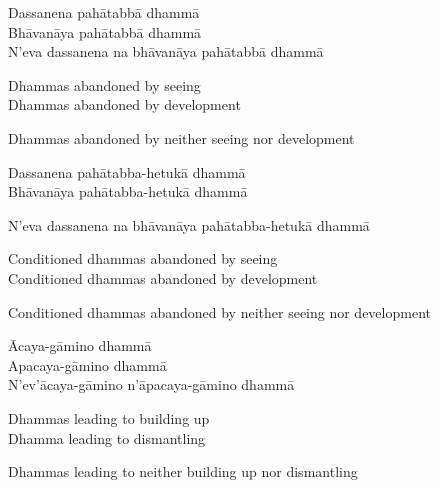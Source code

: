 \begin{pali-hang-continued}
  Dassanena pahātabbā dhammā\\
  Bhāvanāya pahātabbā dhammā\\
  N'eva dassanena na bhāvanāya pahātabbā dhammā
\end{pali-hang-continued}

\ifafive\clearpage\fi

\begin{english-verses}
  Dhammas abandoned by seeing\\
  Dhammas abandoned by development\\
  \begin{english-hang-together-verses}
  Dhammas abandoned by neither seeing nor development
  \end{english-hang-together-verses}
\end{english-verses}

\begin{pali-hang-continued}
  Dassanena pahātabba-hetukā dhammā\\
  Bhāvanāya pahātabba-hetukā dhammā\\
  \begin{pali-hang-together}
  N'eva dassanena na bhāvanāya pahātabba-hetukā dhammā
  \end{pali-hang-together}
\end{pali-hang-continued}

\begin{english-verses}
  Conditioned dhammas abandoned by seeing\\
  Conditioned dhammas abandoned by development\\
  \begin{english-hang-together-verses}
  Conditioned dhammas abandoned by neither seeing nor development
  \end{english-hang-together-verses}
\end{english-verses}

\ifninebythirteen\clearpage\fi

\begin{pali-hang-continued}
  Ācaya-gāmino dhammā\\
  Apacaya-gāmino dhammā\\
  N'ev'ācaya-gāmino n'āpacaya-gāmino dhammā
\end{pali-hang-continued}

\begin{english-verses}
  Dhammas leading to building up\\
  Dhamma leading to dismantling\\
  \begin{english-hang-together-verses}
  Dhammas leading to neither building up nor dismantling
  \end{english-hang-together-verses}
\end{english-verses}

